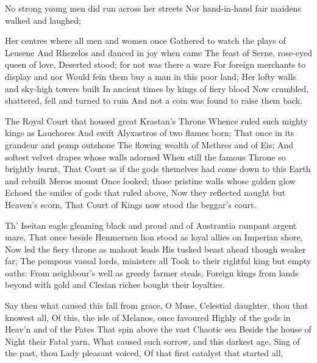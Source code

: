 \documentclass[a4paper,12pt]{article}
\newcommand{\vel}{\verseline}
\begin{document}
\begin{poem}
\begin{stanza}
No strong young men did run across her streets\vel
Nor hand-in-hand fair maidens walked and laughed;
\end{stanza}
\begin{stanza}
Her centres where all men and women once\vel
Gathered to watch the plays of Leusene\vel
And Rhezelos and danced in joy when came\vel
The feast of Serne, rose-eyed queen of love,\vel
Deserted stood; for not was there a ware\vel
For foreign merchants to display and nor\vel
Would fein them buy a man in this poor land;\vel
Her lofty walls and sky-high towers built\vel
In ancient times by kings of fiery blood\vel
Now crumbled, shattered, fell and turned to ruin\vel
And not a coin was found to raise them back.
\end{stanza}
\begin{stanza}
The Royal Court that housed great Krastan's Throne\vel
Whence ruled such mighty kings as Lauchores\vel
And swift Alyxastros of two flames born;\vel
That once in its grandeur and pomp outshone\vel
The flowing wealth of Methres and of Eis;\vel
And softest velvet drapes whose walls adorned\vel
When still the famous Throne so brightly burnt,\vel
That Court as if the gods themelves had come\vel
down to this Earth and rebuilt Meros mount \vel
Once looked; those pristine walls whose golden glow\vel
Echoed the smiles of gods that ruled above,\vel
Now they reflected naught but Heaven's scorn,\vel
That Court of Kings now stood the beggar's court.
\end{stanza}
\begin{stanza}
Th' Iseitan eagle gleaming black and proud\vel
and of Austrantia rampant argent mare,\vel
That once beside Henmernen lion stood\vel
as loyal allies on Imperian shore,\vel
Now led the fiery throne as mahout leads\vel
His tusked beast ahead though weaker far;\vel
The pompous vassal lords, ministers all\vel
Took to their rightful king but empty oaths:\vel
From neighbour's well as greedy farmer steals,\vel
Foreign kings from lands beyond with gold\vel
and Clesian riches bought their loyalties.
\end{stanza}
\begin{stanza}
Say then what caused this fall from grace, O Muse,\vel
Celestial daughter, thou that knowest all,\vel
Of this, the isle of Melanos, once favoured\vel
Highly of the gods in Heav'n and of the Fates\vel
That spin above the vast Chaotic sea\vel
Beside the house of Night their Fatal yarn,\vel
What caused such sorrow, and this darkest age,\vel
Sing of the past, thou Lady pleasant voiced,\vel
Of that first catalyst that started all,\vel

\end{stanza}
\end{poem}
\end{document}
